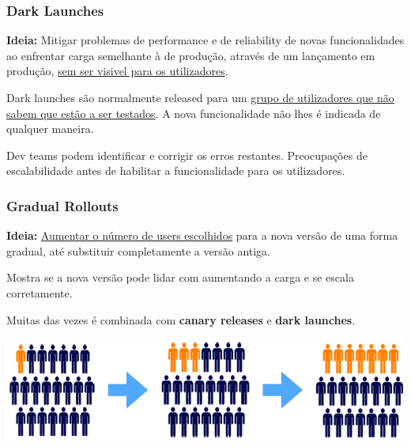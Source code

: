 \documentclass{article}
\begin{document}
\subsubsection{Dark Launches}

\begin{flushleft}
  \textbf{Ideia:} Mitigar problemas de performance e de reliability
  de novas funcionalidades ao enfrentar carga semelhante à de produção,
  através de um lançamento em produção, \uline{sem ser visivel para os utilizadores}.

  \vspace{2mm}

  Dark launches são normalmente released para um \uline{grupo de
  utilizadores que não sabem que estão a ser testados}. A nova funcionalidade
  não lhes é indicada de qualquer maneira.

  Dev teams podem identificar e corrigir os erros restantes.
  Preocupações de escalabilidade antes de habilitar a funcionalidade para os utilizadores.
\end{flushleft}

\pagebreak

\subsubsection{Gradual Rollouts}

\begin{flushleft}
  \textbf{Ideia:} \uline{Aumentar o número de users escolhidos}
  para a nova versão de uma forma gradual, até substituir completamente
  a versão antiga.

  Mostra se a nova versão pode lidar com
  aumentando a carga e se escala corretamente.

  \vspace{2mm}

  Muitas das vezes é combinada com \textbf{canary releases} e
  \textbf{dark launches}.
\end{flushleft}

\begin{center}
  \includegraphics[scale=0.4]{42}
\end{center}
\end{document}
